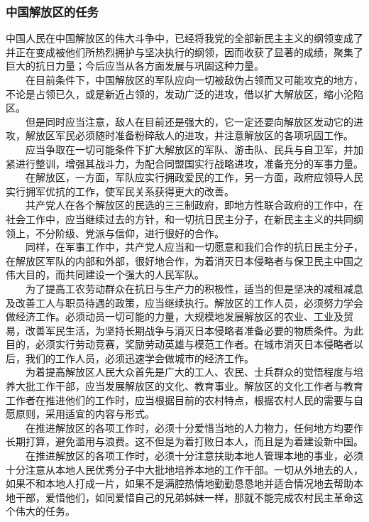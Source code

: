 \documentclass[cn,11pt,chinese]{elegantbook}
\def\myformat#1{\hfil\hfil #1}
\begin{document}
\subsubsection*{\myformat{中国解放区的任务}}
中国人民在中国解放区的伟大斗争中，已经将我党的全部新民主主义的纲领变成了并正在变成被他们所热烈拥护与坚决执行的纲领，因而收获了显著的成绩，聚集了巨大的抗日力量；今后应当从各方面发展与巩固这种力量。\\
　　在目前条件下，中国解放区的军队应向一切被敌伪占领而又可能攻克的地方，不论是占领已久，或是新近占领的，发动广泛的进攻，借以扩大解放区，缩小沦陷区。\\
　　但是同时应当注意，敌人在目前还是强大的，它一定还要向解放区发动它的进攻，解放区军民必须随时准备粉碎敌人的进攻，并注意解放区的各项巩固工作。\\
　　应当争取在一切可能条件下扩大解放区的军队、游击队、民兵与自卫军，并加紧进行整训，增强其战斗力，为配合同盟国实行战略进攻，准备充分的军事力量。\\
　　在解放区，一方面，军队应实行拥政爱民的工作，另一方面，政府应领导人民实行拥军优抗的工作，使军民关系获得更大的改善。\\
　　共产党人在各个解放区的民选的三三制政府，即地方性联合政府的工作中，在社会工作中，应当继续过去的方针，和一切抗日民主分子，在新民主主义的共同纲领上，不分阶级、党派与信仰，进行很好的合作。\\
　　同样，在军事工作中，共产党人应当和一切愿意和我们合作的抗日民主分子，在解放区军队的内部和外部，很好地合作，为着消灭日本侵略者与保卫民主中国之伟大目的，而共同建设一个强大的人民军队。\\
　　为了提高工农劳动群众在抗日与生产力的积极性，适当的但是坚决的减租减息及改善工人与职员待遇的政策，应当继续执行。解放区的工作人员，必须努力学会做经济工作。必须动员一切可能的力量，大规模地发展解放区的农业、工业及贸易，改善军民生活，为坚持长期战争与消灭日本侵略者准备必要的物质条件。为此目的，必须实行劳动竞赛，奖励劳动英雄与模范工作者。在城市消灭日本侵略者以后，我们的工作人员，必须迅速学会做城市的经济工作。\\
　　为着提高解放区人民大众首先是广大的工人、农民、士兵群众的觉悟程度与培养大批工作干部，应当发展解放区的文化、教育事业。解放区的文化工作者与教育工作者在推进他们的工作时，应当根据目前的农村特点，根据农村人民的需要与自愿原则，采用适宜的内容与形式。\\
　　在推进解放区的各项工作时，必须十分爱惜当地的人力物力，任何地方均要作长期打算，避免滥用与浪费。这不但是为着打败日本人，而且是为着建设新中国。\\
　　在推进解放区的各项工作时，必须十分注意扶助本地人管理本地的事业，必须十分注意从本地人民优秀分子中大批地培养本地的工作干部。一切从外地去的人，如果不和本地人打成一片，如果不是满腔热情地勤勤恳恳地并适合情况地去帮助本地干部，爱惜他们，如同爱惜自己的兄弟姊妹一样，那就不能完成农村民主革命这个伟大的任务。\\
\end{document}
